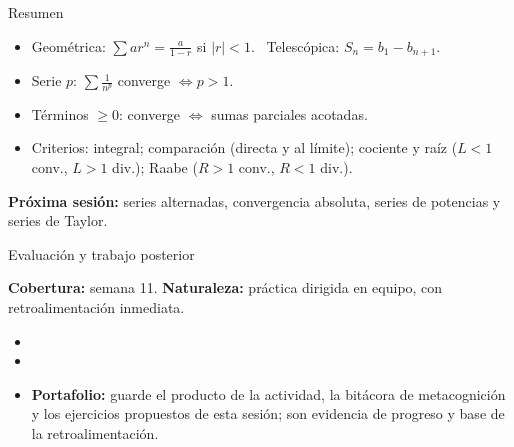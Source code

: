 \documentclass[10pt,aspectratio=169]{beamer}
\begin{document}
\begin{frame}{Resumen}
  \begin{itemize}
    \item Geométrica: $\sum ar^n=\frac a{1-r}$ si $|r|<1$. \ Telescópica: $S_n=b_1-b_{n+1}$.
    \item Serie $p$: $\sum\frac1{n^p}$ converge $\iff p>1$.
    \item Términos $\ge0$: converge $\iff$ sumas parciales acotadas.
    \item Criterios: integral; comparación (directa y al límite); cociente y raíz ($L<1$ conv., $L>1$ div.); Raabe ($R>1$ conv., $R<1$ div.).
  \end{itemize}
  \vspace{3mm}
  \textbf{Próxima sesión:} series alternadas, convergencia absoluta, series de potencias y series de Taylor.
\end{frame}


\begin{frame}{Evaluación y trabajo posterior}
  \small
  \begin{evalbox}
    \textbf{Cobertura:} semana 11. \textbf{Naturaleza:} práctica dirigida en equipo, con retroalimentación inmediata.
  \end{evalbox}
  \begin{itemize}
    \item \criterios
    \item \declaracionia
    \item \textbf{Portafolio:} guarde el producto de la actividad, la bitácora de metacognición y los ejercicios propuestos de esta sesión; son evidencia de progreso y base de la retroalimentación.
  \end{itemize}
\end{frame}
\end{document}
